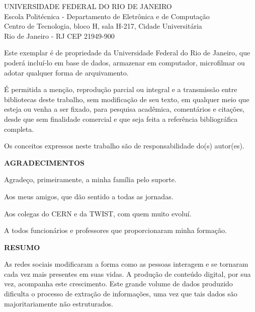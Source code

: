 \pagebreak

\vspace{0.5cm}

UNIVERSIDADE FEDERAL DO RIO DE JANEIRO \\
Escola Politécnica - Departamento de Eletrônica e de Computação \\
Centro de Tecnologia, bloco H, sala H-217, Cidade Universitária \\
Rio de Janeiro - RJ      CEP 21949-900\\
\vspace{0.5cm}

Este exemplar é de propriedade da Universidade Federal do Rio de Janeiro, que poderá incluí-lo em base de dados, armazenar em computador, microfilmar ou adotar qualquer forma de arquivamento.

É permitida a menção, reprodução parcial ou integral e a transmissão entre bibliotecas deste trabalho, sem modificação de seu texto, em qualquer meio que esteja ou venha a ser fixado, para pesquisa acadêmica, comentários e citações, desde que sem finalidade comercial e que seja feita a referência bibliográfica completa.

Os conceitos expressos neste trabalho são de responsabilidade do(s) autor(es).

\pagebreak

\begin{center}
\textbf{AGRADECIMENTOS}
\end{center}
\vspace{0.5cm}

Agradeço, primeiramente, a minha família pelo suporte.

Aos meus amigos, que dão sentido a todas as jornadas.

Aos colegas do CERN e da TWIST, com quem muito evoluí.

A todos funcionários e professores que proporcionaram minha formação.

\pagebreak

\begin{center}
\textbf{RESUMO}
\end{center}
\vspace{0.5cm}

As redes sociais modificaram a forma como as pessoas interagem e se tornaram cada vez mais presentes em suas vidas.
A produção de conteúdo digital, por sua vez, acompanha este crescimento.
Este grande volume de dados produzido dificulta o processo de extração de informações, uma vez que tais dados são
majoritariamente não estruturados.

